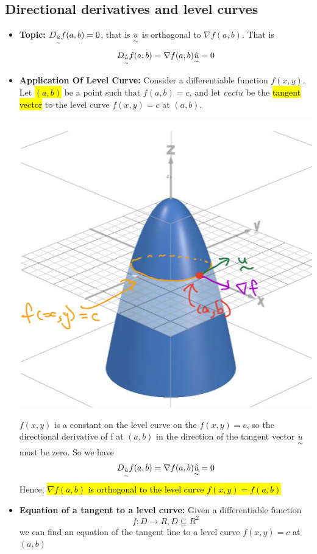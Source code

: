 \documentclass{article}
\begin{document}
  \subsection*{Directional derivatives and level curves}
  \begin{itemize}
  	\item \textbf{Topic:} $D_{\hat{\underset{\sim}{u}}}f(a,b) = 0$, that is $\underset{\sim}{u}$ is orthogonal to $\nabla f(a,b)$. That is
      $$
        D_{\hat{\underset{\sim}{u}}}f(a,b) = \nabla f(a,b) \hat{\underset{\sim}{u}} = 0
      $$

    \item \textbf{Application Of Level Curve:} Consider a differentiable function $f(x,y)$. Let \hl{$(a,b)$} be a point such that $f(a,b) = c$, and let $vect{u}$ be the \hl{tangent vector} to the level curve $f(x,y) = c$ at $(a,b)$. 

  	\includegraphics[width=\linewidth]{Graphs/w10_1.png}

    $f(x,y)$ is a constant on the level curve on the $f(x,y)=c$, so the directional derivative of f at $(a,b)$ in the direction of the tangent vector $\underset{\sim}{u}$ must be zero. So we have
    $$
      D_{\hat{\underset{\sim}{u}}}f(a,b) = \nabla f(a,b) \hat{\underset{\sim}{u}} = 0
    $$
    Hence, \hl{$\nabla f(a,b)$ is orthogonal to the level curve $f(x,y)=f(a,b)$}

    \item \textbf{Equation of a tangent to a level curve:} Given a differentiable function
    $$
      f: D \rightarrow R, D \subseteq R^2
    $$
    we can find  an equation of the tangent line to a level curve $f(x,y) = c$ at $(a,b)$


\end{itemize}
\end{document}
